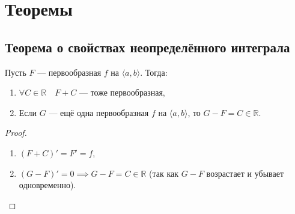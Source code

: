 
\section{Теоремы}

\subsection{Теорема о свойствах неопределённого интеграла}

\begin{ntheorem} \hypertarget{t1_1}{}
	Пусть \(F\) --- первообразная \(f\) на \(\langle a, b \rangle\). Тогда:
	\begin{enumerate}
		\item \(\forall C \in \mathbb{R} \quad F + C\) --- тоже первообразная,
		\item Если \(G\) --- ещё одна первообразная \(f\) на \(\langle a, b \rangle\), то \(G - F = C \in \mathbb{R}\).
	\end{enumerate}
\end{ntheorem}
\begin{proof}
	\begin{enumerate}
		\item $(F + C)' = F' = f$,
		\item \((G - F)' = 0 \implies G - F = C \in \mathbb{R}\) (так как $G - F$ возрастает и убывает одновременно).
	\end{enumerate}
\end{proof}

